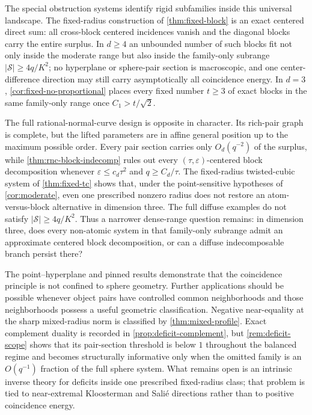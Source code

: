 \documentclass[11pt,letterpaper]{amsart}
\theoremstyle{definition}
\theoremstyle{remark}
\newcommand{\1}{\mathbf 1}
\begin{document}
The special obstruction systems identify rigid subfamilies inside this universal landscape.  The fixed-radius construction of \cref{thm:fixed-block} is an exact centered direct sum: all cross-block centered incidences vanish and the diagonal blocks carry the entire surplus.  In $d\ge4$ an unbounded number of such blocks fit not only inside the moderate range but also inside the family-only subrange $|\mathcal S|\ge4q/K^2$; no hyperplane or sphere-pair section is macroscopic, and one center-difference direction may still carry asymptotically all coincidence energy.  In $d=3$, \cref{cor:fixed-no-proportional} places every fixed number $t\ge3$ of exact blocks in the same family-only range once $C_1>t/\sqrt2$.

The full rational-normal-curve design is opposite in character.  Its rich-pair graph is complete, but the lifted parameters are in affine general position up to the maximum possible order.  Every pair section carries only $O_d(q^{-2})$ of the surplus, while \cref{thm:rnc-block-indecomp} rules out every $(\tau,\varepsilon)$-centered block decomposition whenever $\varepsilon\le c_d\tau^2$ and $q\ge C_d/\tau$.  The fixed-radius twisted-cubic system of \cref{thm:fixed-tc} shows that, under the point-sensitive hypotheses of \cref{cor:moderate}, even one prescribed nonzero radius does not restore an atom-versus-block alternative in dimension three.  The full diffuse examples do not satisfy $|\mathcal S|\ge4q/K^2$.  Thus a narrower dense-range question remains: in dimension three, does every non-atomic system in that family-only subrange admit an approximate centered block decomposition, or can a diffuse indecomposable branch persist there?

The point--hyperplane and pinned results demonstrate that the coincidence principle is not confined to sphere geometry.  Further applications should be possible whenever object pairs have controlled common neighborhoods and those neighborhoods possess a useful geometric classification.  Negative near-equality at the sharp mixed-radius norm is classified by \cref{thm:mixed-profile}.  Exact complement duality is recorded in \cref{prop:deficit-complement}, but \cref{rem:deficit-scope} shows that its pair-section threshold is below $1$ throughout the balanced regime and becomes structurally informative only when the omitted family is an $O(q^{-1})$ fraction of the full sphere system.  What remains open is an intrinsic inverse theory for deficits inside one prescribed fixed-radius class; that problem is tied to near-extremal Kloosterman and Sali\'e directions rather than to positive coincidence energy.
\end{document}
